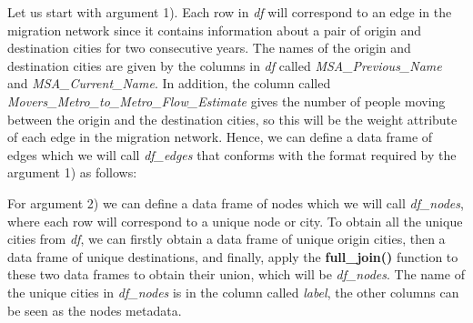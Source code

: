 \documentclass[
  letterpaper,
  DIV=11,
  numbers=noendperiod]{scrreprt}
\newenvironment{Shaded}{\begin{snugshade}}{\end{snugshade}}
\newcommand{\AttributeTok}[1]{\textcolor[rgb]{0.40,0.45,0.13}{#1}}
\newcommand{\CommentTok}[1]{\textcolor[rgb]{0.37,0.37,0.37}{#1}}
\newcommand{\FunctionTok}[1]{\textcolor[rgb]{0.28,0.35,0.67}{#1}}
\newcommand{\NormalTok}[1]{\textcolor[rgb]{0.00,0.23,0.31}{#1}}
\newcommand{\OtherTok}[1]{\textcolor[rgb]{0.00,0.23,0.31}{#1}}
\newcommand{\SpecialCharTok}[1]{\textcolor[rgb]{0.37,0.37,0.37}{#1}}
\newcommand{\StringTok}[1]{\textcolor[rgb]{0.13,0.47,0.30}{#1}}
\begin{document}
Let us start with argument 1). Each row in \emph{df} will correspond to
an edge in the migration network since it contains information about a
pair of origin and destination cities for two consecutive years. The
names of the origin and destination cities are given by the columns in
\emph{df} called \emph{MSA\_Previous\_Name} and
\emph{MSA\_Current\_Name}. In addition, the column called
\emph{Movers\_Metro\_to\_Metro\_Flow\_Estimate} gives the number of
people moving between the origin and the destination cities, so this
will be the weight attribute of each edge in the migration network.
Hence, we can define a data frame of edges which we will call
\emph{df\_edges} that conforms with the format required by the argument
1) as follows:

\begin{Shaded}
\end{Shaded}

For argument 2) we can define a data frame of nodes which we will call
\emph{df\_nodes}, where each row will correspond to a unique node or
city. To obtain all the unique cities from \emph{df}, we can firstly
obtain a data frame of unique origin cities, then a data frame of unique
destinations, and finally, apply the \textbf{full\_join()} function to
these two data frames to obtain their union, which will be
\emph{df\_nodes}. The name of the unique cities in \emph{df\_nodes} is
in the column called \emph{label}, the other columns can be seen as the
nodes metadata.
\end{document}
